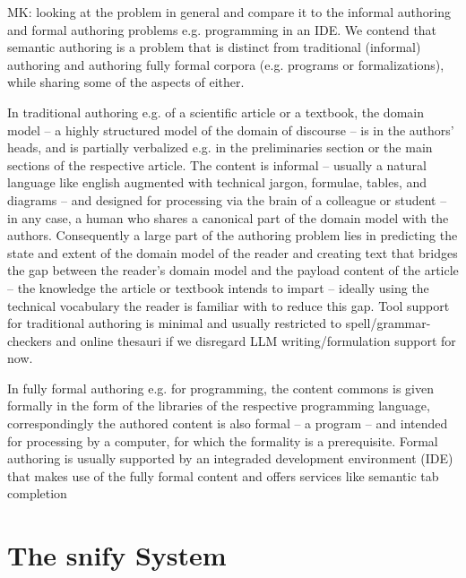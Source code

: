 \documentclass{llncs}
\newcommand\snify{\textsf{snify}\xspace}
\begin{document}
\begin{newpart}{MK: looking at the problem in general and compare it to the informal
    authoring and formal authoring problems e.g. programming in an IDE.}
We contend that semantic authoring is a problem that is distinct from traditional
(informal) authoring and authoring fully formal corpora (e.g. programs or formalizations),
while sharing some of the aspects of either.

In traditional authoring e.g. of a scientific article or a textbook, the domain model -- a
highly structured model of the domain of discourse -- is in the authors' heads, and is
partially verbalized e.g. in the preliminaries section or the main sections of the
respective article. The content is informal -- usually a natural language like english
augmented with technical jargon, formulae, tables, and diagrams -- and designed for
processing via the brain of a colleague or student -- in any case, a human who shares a
canonical part of the domain model with the authors. Consequently a large part of the authoring problem lies in
predicting the state and extent of the domain model of the reader and creating text that
bridges the gap between the reader's domain model and the payload content of the article
-- the knowledge the article or textbook intends to impart -- ideally using the technical
vocabulary the reader is familiar with to reduce this gap. Tool support for traditional
authoring is minimal and usually restricted to spell/grammar-checkers and online thesauri
if we disregard LLM writing/formulation support for now.

In fully formal authoring e.g. for programming, the content commons is given formally in
the form of the libraries of the respective programming language, correspondingly the
authored content is also formal -- a program -- and intended for processing by a computer,
for which the formality is a prerequisite. Formal authoring is usually supported by an
integraded development environment (IDE) that makes use of the fully formal content and
offers services like semantic tab completion 

\end{newpart}

  
\section{The \snify System}
\end{document}
